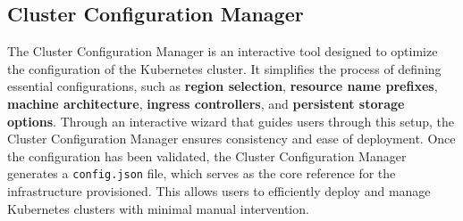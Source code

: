 \subsection{Cluster Configuration Manager}
The Cluster Configuration Manager is an interactive tool designed to optimize the configuration of the Kubernetes cluster. It simplifies the process of defining essential configurations,
such as \textbf{region selection}, \textbf{resource name prefixes}, \textbf{machine architecture}, \textbf{ingress controllers}, and \textbf{persistent storage options}. Through an interactive
wizard that guides users through this setup, the Cluster Configuration Manager ensures consistency and ease of deployment. Once the configuration has been validated, the Cluster Configuration Manager
generates a \texttt{config.json} file, which serves as the core reference for the infrastructure provisioned. This allows users to efficiently deploy and manage Kubernetes clusters with minimal manual intervention. 


